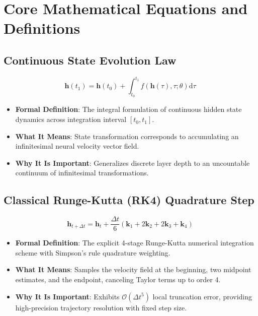 \documentclass[11pt,a4paper]{article}
\theoremstyle{definition}
\begin{document}
\section{Core Mathematical Equations and Definitions}

\subsection{Continuous State Evolution Law}
{\boldmath
\begin{equation}
\mathbf{h}(t_1) = \mathbf{h}(t_0) + \int_{t_0}^{t_1} f(\mathbf{h}(\tau), \tau; \theta) \mathrm{d}\tau
\end{equation}
}
\begin{itemize}
    \item \textbf{Formal Definition}: The integral formulation of continuous hidden state dynamics across integration interval $[t_0, t_1]$.
    \item \textbf{What It Means}: State transformation corresponds to accumulating an infinitesimal neural velocity vector field.
    \item \textbf{Why It Is Important}: Generalizes discrete layer depth to an uncountable continuum of infinitesimal transformations.
\end{itemize}

\subsection{Classical Runge-Kutta (RK4) Quadrature Step}
{\boldmath
\begin{equation}
\mathbf{h}_{t+\Delta t} = \mathbf{h}_t + \frac{\Delta t}{6} \left( \mathbf{k}_1 + 2\mathbf{k}_2 + 2\mathbf{k}_3 + \mathbf{k}_4 \right)
\end{equation}
}
\begin{itemize}
    \item \textbf{Formal Definition}: The explicit 4-stage Runge-Kutta numerical integration scheme with Simpson's rule quadrature weighting.
    \item \textbf{What It Means}: Samples the velocity field at the beginning, two midpoint estimates, and the endpoint, canceling Taylor terms up to order 4.
    \item \textbf{Why It Is Important}: Exhibits $\mathcal{O}(\Delta t^5)$ local truncation error, providing high-precision trajectory resolution with fixed step size.
\end{itemize}
\end{document}
